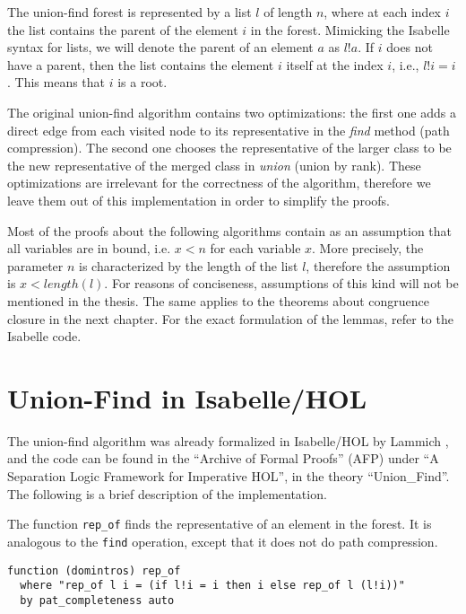 The union-find forest is represented by a list $l$ of length $n$, where at each index $i$ the list contains the parent of the element $i$ in the forest.
Mimicking the Isabelle syntax for lists, we will denote the parent of an element $a$ as $l ! a$.
If $i$ does not have a parent, then the list contains the element $i$ itself at the index $i$, i.e., $l!i = i$. This means that $i$ is a root.

The original union-find algorithm \cite{Tarjan} contains two optimizations: the first one adds a direct edge from each visited node to its representative in the \emph{find} method (path compression). The second one chooses the representative of the larger class to be the new representative of the merged class in \emph{union} (union by rank). These optimizations are irrelevant for the correctness of the algorithm, therefore we leave them out of this implementation in order to simplify the proofs.

Most of the proofs about the following algorithms contain as an assumption that all variables are in bound, i.e. $x < n$ for each variable $x$.
More precisely, the parameter $n$ is characterized by the length of the list $l$, therefore the assumption is $x < length(l)$.
For reasons of conciseness, assumptions of this kind will not be mentioned in the thesis. The same applies to the theorems about congruence closure in the next chapter.
For the exact formulation of the lemmas, refer to the Isabelle code.

\section{Union-Find in Isabelle/HOL}
\label{section:uf-isabelle}

The union-find algorithm was already formalized in Isabelle/HOL by Lammich \cite{unionfind-isabelle}, and the code can be found in the ``Archive of Formal Proofs'' (AFP) under ``A Separation Logic Framework for Imperative HOL'', in the theory ``Union\_Find''\cite{afp, Sep}. The following is a brief description of the implementation.

The function \lstinline{rep_of} finds the representative of an element in the forest. It is analogous to the \lstinline{find} operation, except that it does not do path compression.

\begin{lstlisting}
function (domintros) rep_of
  where "rep_of l i = (if l!i = i then i else rep_of l (l!i))"
  by pat_completeness auto
\end{lstlisting}

